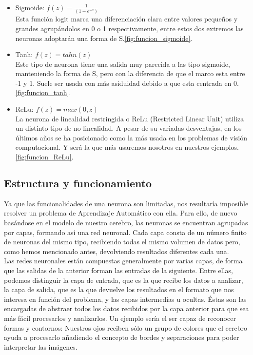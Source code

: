 \begin{itemize}
    \item Sigmoide: $f(z) = \frac{1}{(1-e^{-z})}$\\
    Esta función logit marca una diferenciación clara entre valores pequeños y grandes agrupándolos en 0 o 1 respectivamente, entre estos dos extremos las neuronas adoptarán una forma de S.\ref{fig:funcion_sigmoide}.

%

    \item Tanh: $f(z)= tahn(z)$\\
    Este tipo de neurona tiene una salida muy parecida a las tipo sigmoide, manteniendo la forma de S, pero con la diferencia de que el marco esta entre -1 y 1. Suele ser usada con más asiduidad debido a que esta centrada en 0.\ref{fig:funcion_tanh}.

%

    \item ReLu: $f(z) = max(0,z)$\\
    La neurona de linealidad restringida o ReLu (Restricted Linear Unit) utiliza un distinto tipo de no linealidad. A pesar de su variadas desventajas, en los últimos años se ha posicionado como la más usada en los problemas de visión computacional. Y será la que más usaremos nosotros en nuestros ejemplos.\ref{fig:funcion_ReLu}.

%

\end{itemize}

\subsection{Estructura y funcionamiento}
Ya que las funcionalidades de una neurona son limitadas, nos resultaría imposible resolver un problema de Aprendizaje Automático con ella. Para ello, de nuevo basándose en el modelo de nuestro cerebro, las neuronas se encuentran agrupadas por capas, formando así una red neuronal. Cada capa consta de un número finito de neuronas del mismo tipo, recibiendo todas el mismo volumen de datos pero, como hemos mencionado antes, devolviendo resultados diferentes cada una. \\

Las redes neuronales están compuestas generalmente por varias capas, de forma que las salidas de la anterior forman las entradas de la siguiente. Entre ellas, podemos distinguir la capa de entrada, que es la que recibe los datos a analizar, la capa de salida, que es la que devuelve los resultados en el formato que nos interesa en función del problema, y las capas intermedias u ocultas. Éstas son las encargadas de abstraer todos los datos recibidos por la capa anterior para que sea más fácil procesarlos y analizarlos. Un ejemplo sería el ser capaz de reconocer formas y contornos: Nuestros ojos reciben sólo un grupo de colores que el cerebro ayuda a procesarlo añadiendo el concepto de bordes y separaciones para poder interpretar las imágenes. \\

